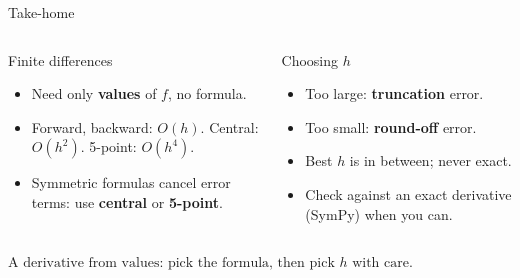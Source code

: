 \documentclass[aspectratio=169]{beamer}
\newcommand{\cbox}[2]{\colorbox{#1}{\ensuremath{\displaystyle #2}}}
\begin{document}
\begin{frame}{Take-home}
\begin{columns}[T]
\begin{column}{0.48\textwidth}
\begin{exampleblock}{Finite differences}
\small
\begin{itemize}
\item Need only \textbf{values} of $f$, no formula.
\item Forward, backward: $O(h)$. Central: $O(h^2)$. 5-point: $O(h^4)$.
\item Symmetric formulas cancel error terms: use \textbf{central} or \textbf{5-point}.
\end{itemize}
\end{exampleblock}
\end{column}
\begin{column}{0.48\textwidth}
\begin{alertblock}{Choosing $h$}
\small
\begin{itemize}
\item Too large: \textbf{truncation} error.
\item Too small: \textbf{round-off} error.
\item Best $h$ is in between; never exact.
\item Check against an exact derivative (SymPy) when you can.
\end{itemize}
\end{alertblock}
\end{column}
\end{columns}
\vspace{0.8em}
\centering
\cbox{accent!12}{\text{A derivative from values: pick the formula, then pick } h \text{ with care.}}
\end{frame}
\end{document}
